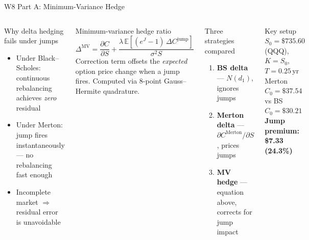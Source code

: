 \documentclass[aspectratio=169,10pt]{beamer}
\begin{document}
\begin{frame}{W8 Part A: Minimum-Variance Hedge}
\begin{columns}[T]
\begin{block}{Why delta hedging fails under jumps}
\footnotesize
\begin{itemize}\itemsep3pt
  \item Under Black--Scholes: continuous rebalancing achieves \emph{zero} residual
  \item Under Merton: jump fires instantaneously — no rebalancing fast enough
  \item Incomplete market $\Rightarrow$ residual error is unavoidable
\end{itemize}
\end{block}

\begin{block}{Minimum-variance hedge ratio}
\footnotesize
\[
  \Delta^{\mathrm{MV}} = \frac{\partial C}{\partial S}
  + \frac{\lambda\,\mathbb{E}[(e^{J}-1)\,\Delta C^{\mathrm{jump}}]}{\sigma^{2}S}
\]
Correction term offsets the \emph{expected} option price change when a jump fires.
Computed via 8-point Gauss--Hermite quadrature.
\end{block}

\begin{block}{Three strategies compared}
\footnotesize
\begin{enumerate}\itemsep3pt
  \item \textbf{BS delta} — $N(d_1)$, ignores jumps
  \item \textbf{Merton delta} — $\partial C^{\mathrm{Merton}}/\partial S$, prices jumps
  \item \textbf{MV hedge} — equation above, corrects for jump impact
\end{enumerate}
\end{block}

\begin{alertblock}{Key setup}
\footnotesize
$S_0 = \$735.60$ (QQQ), $K = S_0$, $T = 0.25$\,yr\\
Merton $C_0 = \$37.54$ vs BS $C_0 = \$30.21$\\
\textbf{Jump premium: \$7.33 (24.3\%)}
\end{alertblock}
\end{columns}
\end{frame}
\end{document}
